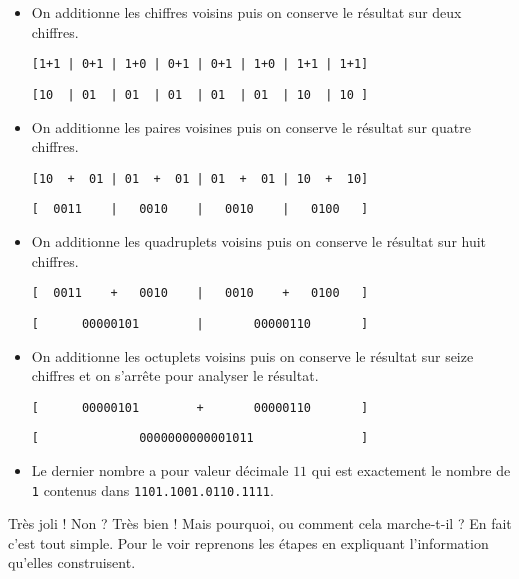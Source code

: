 \documentclass[12pt]{amsart}
\begin{document}
\begin{itemize}[label=\small\textbullet]
	\item On additionne les chiffres voisins puis on conserve le résultat sur deux chiffres.

	\begin{center}
	\verb-[1+1 | 0+1 | 1+0 | 0+1 | 0+1 | 1+0 | 1+1 | 1+1]-

	\verb-[10  | 01  | 01  | 01  | 01  | 01  | 10  | 10 ]-
	\end{center}


	\item On additionne les paires voisines puis on conserve le résultat sur quatre chiffres.

	\begin{center}
	\verb-[10  +  01 | 01  +  01 | 01  +  01 | 10  +  10]-

	\verb-[  0011    |   0010    |   0010    |   0100   ]-
	\end{center}


	\item On additionne les quadruplets voisins puis on conserve le résultat sur huit chiffres.

	\begin{center}
	\verb-[  0011    +   0010    |   0010    +   0100   ]-

	\verb-[      00000101        |       00000110       ]-
	\end{center}


	\item On additionne les octuplets voisins puis on conserve le résultat sur seize chiffres et on s'arrête pour analyser le résultat.

	\begin{center}
	\verb-[      00000101        +       00000110       ]-

	\verb-[              0000000000001011               ]-
	\end{center}


	\item Le dernier nombre a pour valeur décimale $11$ qui est exactement le nombre de \verb+1+ contenus dans \verb+1101.1001.0110.1111+.
\end{itemize}




Très joli ! Non ? Très bien ! Mais pourquoi, ou comment cela marche-t-il ? En fait c'est tout simple. Pour le voir reprenons les étapes en expliquant l'information qu'elles construisent.
\end{document}
